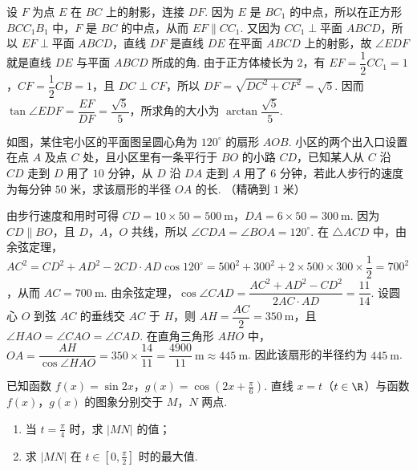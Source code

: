 \begin{solution}
设 \(F\) 为点 \(E\) 在 \(BC\) 上的射影，连接 \(DF\). 因为 \(E\) 是 \(BC_{1}\) 的中点，所以在正方形 \(BCC_{1}B_{1}\) 中，\(F\) 是 \(BC\) 的中点，从而 \(EF\parallel CC_{1}\). 又因为 \(CC_{1}\perp\text{平面 }ABCD\)，所以 \(EF\perp\text{平面 }ABCD\)，直线 \(DF\) 是直线 \(DE\) 在平面 \(ABCD\) 上的射影，故 \(\angle EDF\) 就是直线 \(DE\) 与平面 \(ABCD\) 所成的角. 由于正方体棱长为 \(2\)，有 \(EF=\dfrac{1}{2}CC_{1}=1\)，\(CF=\dfrac{1}{2}CB=1\)，且 \(DC\perp CF\)，所以 \(DF=\sqrt{DC^{2}+CF^{2}}=\sqrt{5}\). 因而 \(\tan\angle EDF=\dfrac{EF}{DF}=\dfrac{\sqrt{5}}{5}\)，所求角的大小为 \(\arctan\dfrac{\sqrt{5}}{5}\).
\end{solution}

\begin{problem}
如图，某住宅小区的平面图呈圆心角为 \(120^{\circ}\) 的扇形 \(AOB\). 小区的两个出入口设置在点 \(A\) 及点 \(C\) 处，且小区里有一条平行于 \(BO\) 的小路 \(CD\)，已知某人从 \(C\) 沿 \(CD\) 走到 \(D\) 用了 \(10\) 分钟，从 \(D\) 沿 \(DA\) 走到 \(A\) 用了 \(6\) 分钟，若此人步行的速度为每分钟 \(50\) 米，求该扇形的半径 \(OA\) 的长. （精确到 \(1\) 米）

\end{problem}

\begin{solution}
由步行速度和用时可得 \(CD=10\times50=500\mathrm{~m}\)，\(DA=6\times50=300\mathrm{~m}\). 因为 \(CD\parallel BO\)，且 \(D\)，\(A\)，\(O\) 共线，所以 \(\angle CDA=\angle BOA=120^{\circ}\). 在 \(\triangle ACD\) 中，由余弦定理，\(AC^{2}=CD^{2}+AD^{2}-2CD\cdot AD\cos120^{\circ}=500^{2}+300^{2}+2\times500\times300\times\dfrac{1}{2}=700^{2}\)，从而 \(AC=700\mathrm{~m}\). 由余弦定理，\(\cos\angle CAD=\dfrac{AC^{2}+AD^{2}-CD^{2}}{2AC\cdot AD}=\dfrac{11}{14}\). 设圆心 \(O\) 到弦 \(AC\) 的垂线交 \(AC\) 于 \(H\)，则 \(AH=\dfrac{AC}{2}=350\mathrm{~m}\)，且 \(\angle HAO=\angle CAO=\angle CAD\). 在直角三角形 \(AHO\) 中，\(OA=\dfrac{AH}{\cos\angle HAO}=350\times\dfrac{14}{11}=\dfrac{4900}{11}\mathrm{~m}\approx445\mathrm{~m}\). 因此该扇形的半径约为 \(445\mathrm{~m}\).
\end{solution}

\begin{problem}
已知函数 \( f(x) = \sin 2x \)，\( g(x) = \cos \left(2x + \frac{\pi}{6}\right) \). 直线 \(x=t\)（\(t\in\R\)）与函数 \( f(x) \)，\( g(x) \) 的图象分别交于 \(M\)，\(N\) 两点.
\begin{enumerate}
\item 当 \( t = \frac{\pi}{4} \) 时，求 \( |MN| \) 的值；
\item 求 \( \left|MN\right| \) 在 \( t \in \left[0, \frac{\pi}{2}\right] \) 时的最大值.
\end{enumerate}
\end{problem}

